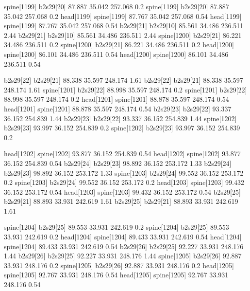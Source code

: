 spine[1199]    b2s29[20]    87.887    35.042    257.068    0.2
spine[1199]    b2s29[20]    87.887    35.042    257.068    0.2
head[1199]    spine[1199]    87.767    35.042    257.068    0.54
head[1199]    spine[1199]    87.767    35.042    257.068    0.54
b2s29[21]    b2s29[10]    85.561    34.486    236.511    2.44
b2s29[21]    b2s29[10]    85.561    34.486    236.511    2.44
spine[1200]    b2s29[21]    86.221    34.486    236.511    0.2
spine[1200]    b2s29[21]    86.221    34.486    236.511    0.2
head[1200]    spine[1200]    86.101    34.486    236.511    0.54
head[1200]    spine[1200]    86.101    34.486    236.511    0.54


b2s29[22]    b2s29[21]    88.338    35.597    248.174    1.61
b2s29[22]    b2s29[21]    88.338    35.597    248.174    1.61
spine[1201]    b2s29[22]    88.998    35.597    248.174    0.2
spine[1201]    b2s29[22]    88.998    35.597    248.174    0.2
head[1201]    spine[1201]    88.878    35.597    248.174    0.54
head[1201]    spine[1201]    88.878    35.597    248.174    0.54
b2s29[23]    b2s29[22]    93.337    36.152    254.839    1.44
b2s29[23]    b2s29[22]    93.337    36.152    254.839    1.44
spine[1202]    b2s29[23]    93.997    36.152    254.839    0.2
spine[1202]    b2s29[23]    93.997    36.152    254.839    0.2


head[1202]    spine[1202]    93.877    36.152    254.839    0.54
head[1202]    spine[1202]    93.877    36.152    254.839    0.54
b2s29[24]    b2s29[23]    98.892    36.152    253.172    1.33
b2s29[24]    b2s29[23]    98.892    36.152    253.172    1.33
spine[1203]    b2s29[24]    99.552    36.152    253.172    0.2
spine[1203]    b2s29[24]    99.552    36.152    253.172    0.2
head[1203]    spine[1203]    99.432    36.152    253.172    0.54
head[1203]    spine[1203]    99.432    36.152    253.172    0.54
b2s29[25]    b2s29[21]    88.893    33.931    242.619    1.61
b2s29[25]    b2s29[21]    88.893    33.931    242.619    1.61


spine[1204]    b2s29[25]    89.553    33.931    242.619    0.2
spine[1204]    b2s29[25]    89.553    33.931    242.619    0.2
head[1204]    spine[1204]    89.433    33.931    242.619    0.54
head[1204]    spine[1204]    89.433    33.931    242.619    0.54
b2s29[26]    b2s29[25]    92.227    33.931    248.176    1.44
b2s29[26]    b2s29[25]    92.227    33.931    248.176    1.44
spine[1205]    b2s29[26]    92.887    33.931    248.176    0.2
spine[1205]    b2s29[26]    92.887    33.931    248.176    0.2
head[1205]    spine[1205]    92.767    33.931    248.176    0.54
head[1205]    spine[1205]    92.767    33.931    248.176    0.54


